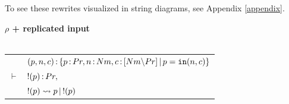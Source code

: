 \documentclass{article}
\begin{document}
To see these rewrites visualized in string diagrams, see Appendix \ref{appendix}.

\vspace{5em}

\begin{mdframed}
\begin{center}
    \textbf{$\rho$ + replicated input}\\~\\
    \begin{tabular}{cl}
         & $(p,n,c)\,{:}\, \{p\,{:}\, Pr, n\,{:}\, Nm, c\,{:}\, [Nm{\setminus} Pr]\,|\, p=\mathtt{in}(n,c)\}$\\ 
         $\vdash$ & $!(p)\,{:}\, Pr,$\\
         & $!(p)\rightsquigarrow p\,|\, !(p)$
    \end{tabular}
\end{center}
\end{mdframed}

\newpage
\end{document}
